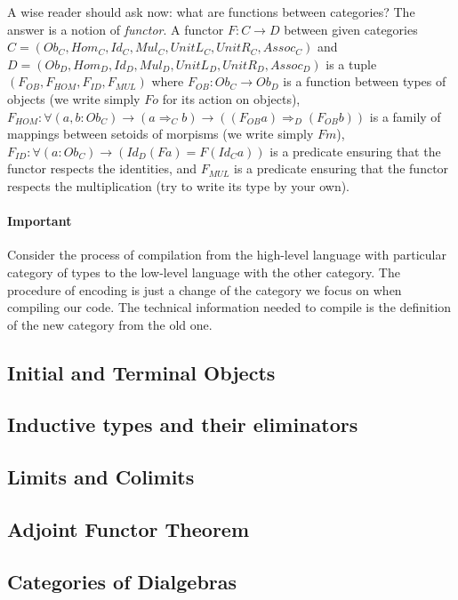 \documentclass[11pt,oneside]{article}
\begin{document}
A wise reader should ask now: what are functions between categories?
The answer is a notion of {\em functor}.
A functor $F : C \rightarrow D$ between given categories
$C = (Ob_C, Hom_C, Id_C, Mul_C, UnitL_C, UnitR_C, Assoc_C)$ and
$D = (Ob_D, Hom_D, Id_D, Mul_D, UnitL_D, UnitR_D, Assoc_D)$
is a tuple $(F_{OB}, F_{HOM}, F_{ID}, F_{MUL})$ where
$F_{OB} : Ob_C \rightarrow Ob_D$ is a function between types of objects
(we write simply $F o$ for its action on objects),
$F_{HOM} : \forall(a, b : Ob_C)\rightarrow (a \Rightarrow_C  b) \rightarrow ((F_{OB} a) \Rightarrow_D (F_{OB} b))$
is a family of mappings between setoids of morpisms
(we write simply $F m$),
$F_{ID} : \forall(a : Ob_C)\rightarrow (Id_D (F a) = F (Id_C a))$
is a predicate ensuring that the functor respects the identities,
and $F_{MUL}$ is a predicate ensuring that the functor respects
the multiplication (try to write its type by your own).

\paragraph{Important}
Consider the process of compilation from the high-level language with
particular category of types to the low-level language
with the other category.
The procedure of encoding is just a change of the category
we focus on when compiling our code.
The technical information needed to compile is
the definition of the new category from the old one.

\subsection{Initial and Terminal Objects}

\subsection{Inductive types and their eliminators}

\subsection{Limits and Colimits}

\subsection{Adjoint Functor Theorem}

\subsection{Categories of Dialgebras}
\end{document}

